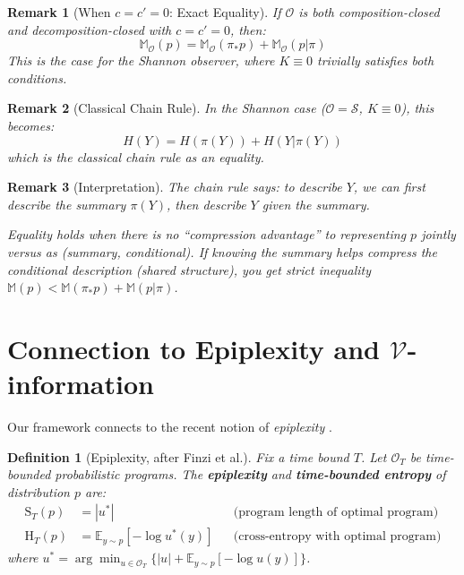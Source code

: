 \documentclass[11pt]{article}
\newtheorem{definition}{Definition}
\newtheorem{remark}{Remark}
\begin{document}
\begin{remark}[When $c = c' = 0$: Exact Equality]
If $\mathcal{O}$ is both composition-closed and decomposition-closed with $c = c' = 0$, then:
\[ \mathbb{M}_\mathcal{O}(p) = \mathbb{M}_\mathcal{O}(\pi_* p) + \mathbb{M}_\mathcal{O}(p|\pi) \]
This is the case for the Shannon observer, where $K \equiv 0$ trivially satisfies both conditions.
\end{remark}

\begin{remark}[Classical Chain Rule]
In the Shannon case ($\mathcal{O} = \mathcal{S}$, $K \equiv 0$), this becomes:
\[ H(Y) = H(\pi(Y)) + H(Y|\pi(Y)) \]
which is the classical chain rule as an equality.
\end{remark}

\begin{remark}[Interpretation]
The chain rule says: to describe $Y$, we can first describe the summary $\pi(Y)$, then describe $Y$ given the summary.

Equality holds when there is no ``compression advantage'' to representing $p$ jointly versus as (summary, conditional). If knowing the summary helps compress the conditional description (shared structure), you get strict inequality $\mathbb{M}(p) < \mathbb{M}(\pi_* p) + \mathbb{M}(p|\pi)$.
\end{remark}



\section{Connection to Epiplexity and $\mathcal V$-information}\label{sec:epiplexity}

Our framework connects to the recent notion of \emph{epiplexity} \cite{finzi2025}.

\begin{definition}[Epiplexity, after Finzi et al.]
Fix a time bound $T$. Let $\mathcal{O}_T$ be time-bounded probabilistic programs. The
\textbf{epiplexity} and \textbf{time-bounded entropy} of distribution $p$ are:
\begin{align}
\mathrm{S}_T(p) &= |u^*| && \text{(program length of optimal program)} \\
\mathrm{H}_T(p) &= \mathbb{E}_{y \sim p}[-\log u^*(y)] && \text{(cross-entropy with optimal program)}
\end{align}
where $u^* = \arg\min_{u \in \mathcal{O}_T}\{|u| + \mathbb{E}_{y \sim p}[-\log u(y)]\}$.
\end{definition}
\end{document}
